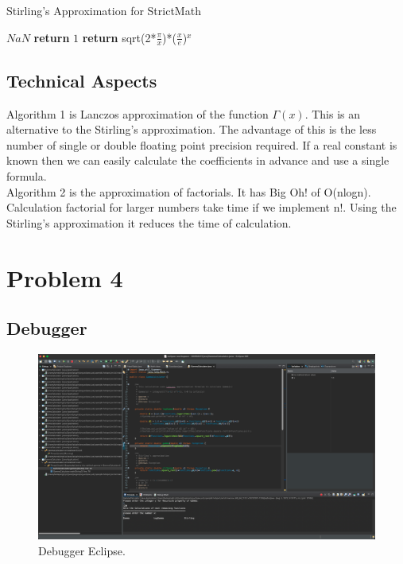 \documentclass[12pt]{report}
\begin{document}
\begin{algorithm}
\caption{Stirling's Approximation for StrictMath}
\begin{algorithmic}[1]
\State $NaN$
\EndIf
{}
\State \textbf{return} $1$
\EndIf
{}
\State \textbf{return}
sqrt(2*$\frac{\pi}{x}$)*($\frac{x}{e}$)$^x$
\EndIf
\end{algorithmic}
\end{algorithm}

\subsection{Technical Aspects}
Algorithm 1 is Lanczos approximation of the function $\Gamma(x).$ This is an alternative to the Stirling's approximation. The advantage of this is the less number of single or double floating point precision required. If a real constant is known then we can easily calculate the coefficients in advance and use a single formula.\\
\newline
Algorithm 2 is the approximation of factorials. It has Big Oh! of O(nlogn). Calculation factorial for larger numbers take time if we implement n!. Using the Stirling's approximation it reduces the time of calculation.

\section{Problem 4}
\subsection{Debugger}
 \begin{figure}[h!]
    \begin{center}
    \includegraphics[width=1.0\linewidth]{Debugger.png}
    \end{center}
    \caption{Debugger Eclipse.}
 \end{figure}
\end{document}
